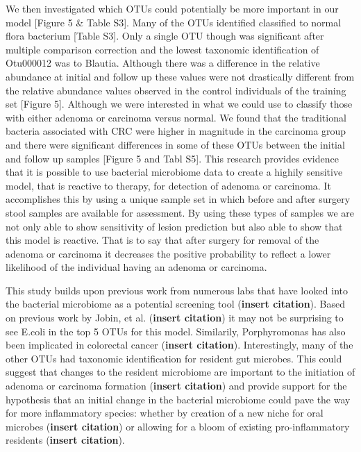 \documentclass[12pt,]{article}
\begin{document}
We then investigated which OTUs could potentially be more important in
our model {[}Figure 5 \& Table S3{]}. Many of the OTUs identified
classified to normal flora bacterium {[}Table S3{]}. Only a single OTU
though was significant after multiple comparison correction and the
lowest taxonomic identification of Otu000012 was to Blautia. Although
there was a difference in the relative abundance at initial and follow
up these values were not drastically different from the relative
abundance values observed in the control individuals of the training set
{[}Figure 5{]}. Although we were interested in what we could use to
classify those with either adenoma or carcinoma versus normal. We found
that the traditional bacteria associated with CRC were higher in
magnitude in the carcinoma group and there were significant differences
in some of these OTUs between the initial and follow up samples
{[}Figure 5 and Tabl S5{]}. This research provides evidence that it is
possible to use bacterial microbiome data to create a highily sensitive
model, that is reactive to therapy, for detection of adenoma or
carcinoma. It accomplishes this by using a unique sample set in which
before and after surgery stool samples are available for assessment. By
using these types of samples we are not only able to show sensitivity of
lesion prediction but also able to show that this model is reactive.
That is to say that after surgery for removal of the adenoma or
carcinoma it decreases the positive probability to reflect a lower
likelihood of the individual having an adenoma or carcinoma.

This study builds upon previous work from numerous labs that have looked
into the bacterial microbiome as a potential screening tool
(\textbf{insert citation}). Based on previous work by Jobin, et al.
(\textbf{insert citation}) it may not be surprising to see E.coli in the
top 5 OTUs for this model. Similarily, Porphyromonas has also been
implicated in colorectal cancer (\textbf{insert citation}).
Interestingly, many of the other OTUs had taxonomic identification for
resident gut microbes. This could suggest that changes to the resident
microbiome are important to the initiation of adenoma or carcinoma
formation (\textbf{insert citation}) and provide support for the
hypothesis that an initial change in the bacterial microbiome could pave
the way for more inflammatory species: whether by creation of a new
niche for oral microbes (\textbf{insert citation}) or allowing for a
bloom of existing pro-inflammatory residents (\textbf{insert citation}).
\end{document}
